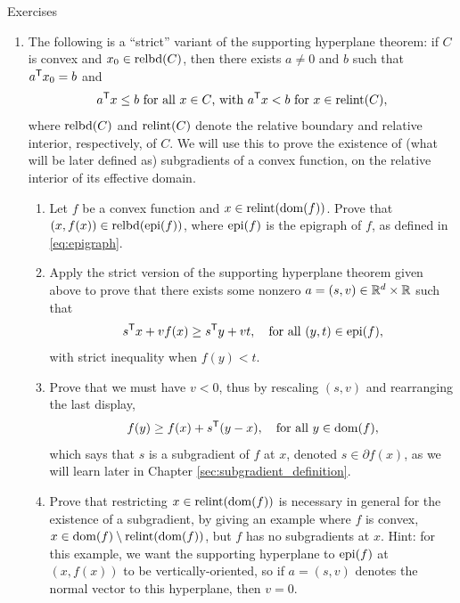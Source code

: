 \begin{xcb}{Exercises}
\begin{enumerate}[label=\thechapter.\arabic*]
\item \label{ex:subgradient_existence} 
  The following is a ``strict'' variant of the supporting hyperplane theorem: if 
  $C$ is convex and $x_0 \in \operatorname{relbd}(C)$, then there exists $a \not=0 $ and $b$ 
  such that $a^{\mathsf{T}} x_0 = b$ and 
  \[
  \text{$a^{\mathsf{T}} x \leq b$ for all $x \in C$, with $a^{\mathsf{T}} x < b$ for $x \in
    \operatorname{relint}(C)$}, 
  \] 
  where $\operatorname{relbd}(C)$ and $\operatorname{relint}(C)$ denote the relative boundary and relative 
  interior, respectively, of $C$. We will use this to prove the existence of
  (what will be later defined as) subgradients of a convex function, on the
  relative interior of its effective domain. 
  
\begin{enumerate}[label=\alph*.]
\item Let $f$ be a convex function and $x \in \operatorname{relint}(\operatorname{dom}(f))$. Prove that 
  $(x,f(x)) \in \operatorname{relbd}(\operatorname{epi}(f))$, where $\operatorname{epi}(f)$ is the epigraph of $f$, as
  defined in \eqref{eq:epigraph}. 
  
\item Apply the strict version of the supporting hyperplane theorem given above
  to prove that there exists some nonzero $a = (s,v) \in \mathbb{R}^d \times \mathbb{R}$ such
  that 
  \[
  s^{\mathsf{T}} x + v f(x) \geq s^{\mathsf{T}} y + v t, \quad \text{for all $(y,t) \in \operatorname{epi}(f)$},  
  \]
  with strict inequality when $f(y) < t$. 

\item Prove that we must have $v < 0$, thus by rescaling $(s,v)$ and rearranging 
  the last display,
  \[
  f(y) \geq f(x) + s^{\mathsf{T}} (y - x), \quad \text{for all $y \in \operatorname{dom}(f)$}, 
  \]
  which says that $s$ is a subgradient of $f$ at $x$, denoted $s \in \partial
  f(x)$, as we will learn later in Chapter \ref{sec:subgradient_definition}. 
  
\item Prove that restricting $x \in \operatorname{relint}(\operatorname{dom}(f))$ is necessary in general
  for the existence of a subgradient, by giving an example where $f$ is convex, 
  $x \in \operatorname{dom}(f) \setminus \operatorname{relint}(\operatorname{dom}(f))$, but $f$ has no subgradients at
  $x$. Hint: for this example, we want the supporting hyperplane to $\operatorname{epi}(f)$ at
  $(x,f(x))$ to be vertically-oriented, so if $a = (s,v)$ denotes the normal
  vector to this hyperplane, then $v=0$.  
\end{enumerate}


\end{enumerate}
\end{xcb}

